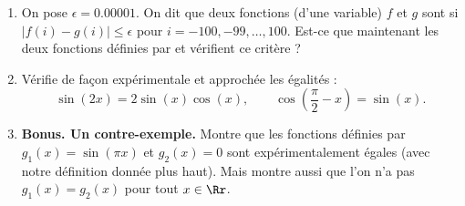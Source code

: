\documentclass[11pt,class=report,crop=false]{standalone}
\begin{document}
\begin{activite}
\begin{enumerate}
\begin{enumerate}
    \item On pose $\epsilon = 0.00001$. On dit que deux fonctions (d'une variable) $f$ et $g$ sont  si $|f(i)-g(i)| \le \epsilon$ pour $i=-100,-99,\ldots,100$. Est-ce que maintenant les deux fonctions  définies par  et  vérifient ce critère ?
    
    \item Vérifie de façon expérimentale et approchée les égalités :
    $$\sin(2x) = 2\sin(x)\cos(x), \qquad \cos\left(\frac\pi2-x\right)=\sin(x).$$

  
  \item \textbf{Bonus. Un contre-exemple.}
  Montre que les fonctions définies par $g_1(x) = \sin(\pi x)$ et $g_2(x)=0$ sont expérimentalement égales (avec notre définition donnée plus haut). Mais montre aussi que l'on n'a pas $g_1(x) = g_2(x)$ pour tout $x\in\Rr$.
  
  \end{enumerate} 
\end{enumerate}

\end{activite}
\end{document}
